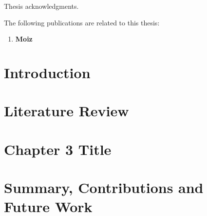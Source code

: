 \documentclass[12pt]{report}
\begin{document}
\begin{acknowledgments}

Thesis acknowledgments.

\end{acknowledgments}

\begin{publications}

The following publications are related to this thesis:

\begin{enumerate}

\item \textbf{Moiz} 

\end{enumerate}

\end{publications}

\chapter{Introduction}
\label{introduction}


\chapter{Literature Review}
\label{literature_review}


\chapter{Chapter 3 Title}
\label{chapter3}



\chapter{Summary, Contributions and Future Work}
\label{conclusion}


  

\end{document}
